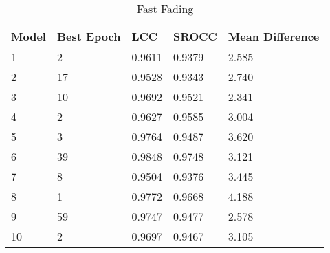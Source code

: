 \begin{table}[h]
\centering
\caption{Fast Fading}
\label{my-label}
\begin{tabular}{|l|l|l|l|l|}
\hline
Model & Best Epoch & LCC    & SROCC  & Mean Difference \\ \hline
1     & 2          & 0.9611 & 0.9379 & 2.585           \\ \hline
2     & 17         & 0.9528 & 0.9343 & 2.740           \\ \hline
3     & 10         & 0.9692 & 0.9521 & 2.341           \\ \hline
4     & 2          & 0.9627 & 0.9585 & 3.004           \\ \hline
5     & 3          & 0.9764 & 0.9487 & 3.620           \\ \hline
6     & 39         & 0.9848 & 0.9748 & 3.121           \\ \hline
7     & 8          & 0.9504 & 0.9376 & 3.445           \\ \hline
8     & 1          & 0.9772 & 0.9668 & 4.188           \\ \hline
9     & 59         & 0.9747 & 0.9477 & 2.578           \\ \hline
10    & 2          & 0.9697 & 0.9467 & 3.105           \\ \hline
\end{tabular}
\end{table}